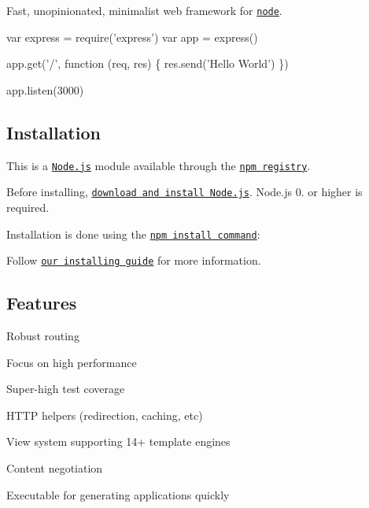 \href{http://expressjs.com/}{\tt }

Fast, unopinionated, minimalist web framework for \href{http://nodejs.org}{\tt node}.

\href{https://npmjs.org/package/express}{\tt } \href{https://npmjs.org/package/express}{\tt } \href{https://travis-ci.org/expressjs/express}{\tt } \href{https://ci.appveyor.com/project/dougwilson/express}{\tt } \href{https://coveralls.io/r/expressjs/express?branch=master}{\tt }


\begin{DoxyCode}
var express = require('express')
var app = express()

app.get('/', function (req, res) \{
  res.send('Hello World')
\})

app.listen(3000)
\end{DoxyCode}


\subsection*{Installation}

This is a \href{https://nodejs.org/en/}{\tt Node.\+js} module available through the \href{https://www.npmjs.com/}{\tt npm registry}.

Before installing, \href{https://nodejs.org/en/download/}{\tt download and install Node.\+js}. Node.\+js 0. or higher is required.

Installation is done using the \href{https://docs.npmjs.com/getting-started/installing-npm-packages-locally}{\tt {\ttfamily npm install} command}\+:




Follow \href{http://expressjs.com/en/starter/installing.html}{\tt our installing guide} for more information.

\subsection*{Features}


\begin{DoxyItemize}
\item Robust routing
\item Focus on high performance
\item Super-\/high test coverage
\item H\+T\+TP helpers (redirection, caching, etc)
\item View system supporting 14+ template engines
\item Content negotiation
\item Executable for generating applications quickly
\end{DoxyItemize}

